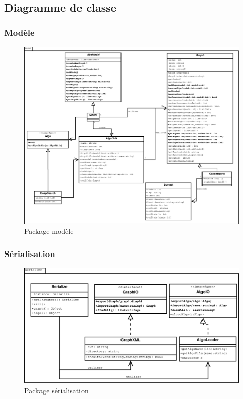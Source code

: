 \documentclass[11pt,a4paper]{article}
\begin{document}
		\subsection{Diagramme de classe}
			\subsubsection*{Modèle}
				\begin{figure}[htbp]
					\begin{center}
						\includegraphics[width=\linewidth]{class_model.eps}
					\end{center}
					\caption{Package modèle}
					\label{img_class_model}
				\end{figure}
				\newpage
			\subsubsection*{Sérialisation}
				\begin{figure}[htbp]
					\begin{center}
						\includegraphics[width=\linewidth]{class_serialize.eps}
					\end{center}
					\caption{Package sérialisation}
					\label{img_class_serialize}
				\end{figure}
\end{document}

